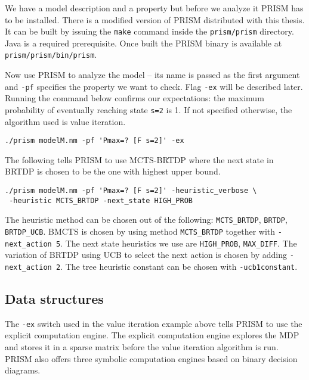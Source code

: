 We have a model description and a property but before we analyze it
PRISM has to be installed.
There is a modified version of PRISM distributed with this thesis. It
can be built by issuing the \verb|make| command inside the
\verb|prism/prism| directory. Java is a required prerequisite.
Once built the PRISM binary is available at \verb|prism/prism/bin/prism|.

Now use PRISM to analyze the model -- its name is passed as the first
argument and \verb|-pf| specifies the property we want to check.
\linebreak Flag \verb|-ex| will be described later.
Running the command below
confirms our expectations: the maximum probability of eventually
reaching state \verb|s=2| is 1. If not specified otherwise, the
algorithm used is value iteration.

\medskip
\begin{verbatim}
./prism modelM.nm -pf 'Pmax=? [F s=2]' -ex
\end{verbatim}
\medskip

The following tells PRISM to use MCTS-BRTDP where the next state in
BRTDP is chosen to be the one with highest upper bound.

\medskip
\begin{verbatim}
./prism modelM.nm -pf 'Pmax=? [F s=2]' -heuristic_verbose \
 -heuristic MCTS_BRTDP -next_state HIGH_PROB
\end{verbatim}
\medskip

The heuristic method can be chosen out of the following:\linebreak
\verb|MCTS_BRTDP|, \verb|BRTDP|, \verb|BRTDP_UCB|. BMCTS is chosen by
using method \verb|MCTS_BRTDP| together with \verb|-next_action 5|.
The next state heuristics we use are
\verb|HIGH_PROB|, \verb|MAX_DIFF|.
The variation of BRTDP using UCB to select the next action is chosen by
adding \verb|-next_action 2|.
The tree heuristic constant can be chosen with
\verb|-ucb1constant|.

\subsection*{Data structures}
The \verb|-ex| switch used in the value iteration example above tells
PRISM to use the explicit computation engine.
The explicit computation engine explores the MDP and stores it in
a sparse matrix before the value iteration algorithm is run.
PRISM also offers three symbolic computation engines based on binary decision
diagrams.

